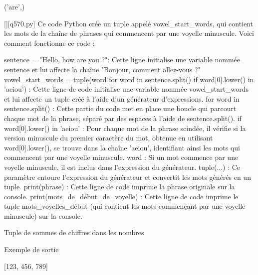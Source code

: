 ('are',)
        \par
        \begin{solution}
            \renewcommand{\nomfichier}{q570.py}
            \pythonfile{\chemincode \nomfichier}[][\nomfichier]
            Ce code Python crée un tuple appelé vowel\_start\_words, qui contient les mots de la chaîne de phrases qui commencent par une voyelle minuscule. Voici comment fonctionne ce code :

    sentence = "Hello, how are you ?": Cette ligne initialise une variable nommée sentence et lui affecte la chaîne "Bonjour, comment allez-vous ?"
    vowel\_start\_words = tuple(word for word in sentence.split() if word[0].lower() in 'aeiou') : Cette ligne de code initialise une variable nommée vowel\_start\_words et lui affecte un tuple créé à l'aide d'un générateur d'expressions.
        for word in sentence.split() : Cette partie du code met en place une boucle qui parcourt chaque mot de la phrase, séparé par des espaces à l'aide de sentence.split().
        if word[0].lower() in 'aeiou' : Pour chaque mot de la phrase scindée, il vérifie si la version minuscule du premier caractère du mot, obtenue en utilisant word[0].lower(), se trouve dans la chaîne 'aeiou', identifiant ainsi les mots qui commencent par une voyelle minuscule.
        word : Si un mot commence par une voyelle minuscule, il est inclus dans l'expression du générateur.
        tuple(...) : Ce paramètre entoure l'expression du générateur et convertit les mots générés en un tuple.
    print(phrase) : Cette ligne de code imprime la phrase originale sur la console.
    print(mots\_de\_début\_de\_voyelle) : Cette ligne de code imprime le tuple mots\_voyelles\_début (qui contient les mots commençant par une voyelle minuscule) sur la console.
        \end{solution}
        

        \question
        Tuple de sommes de chiffres dans les nombres

Exemple de sortie

[123, 456, 789]

